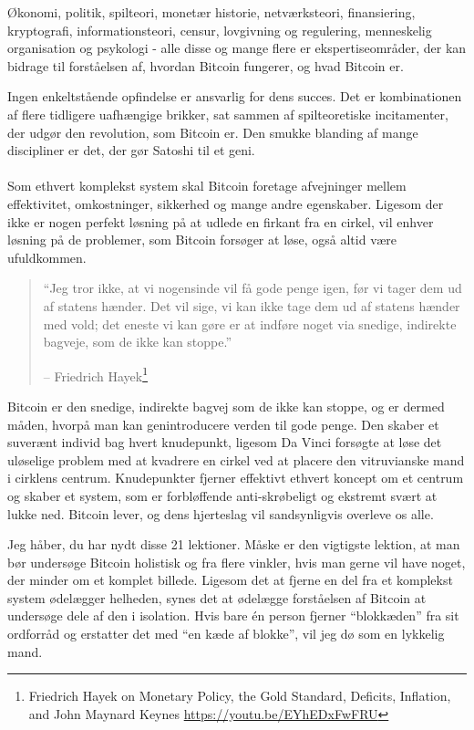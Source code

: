 \documentclass[paper=6in:9in,pagesize=pdftex,
               headinclude=on,footinclude=on,12pt]{scrbook}
\begin{document}
Økonomi, politik, spilteori, monetær historie, netværksteori, finansiering, kryptografi, informationsteori, censur, lovgivning og regulering, menneskelig organisation og psykologi - alle disse og mange flere er ekspertiseområder, der kan bidrage til forståelsen af, hvordan Bitcoin fungerer, og hvad Bitcoin er.

Ingen enkeltstående opfindelse er ansvarlig for dens succes. Det er kombinationen af flere tidligere uafhængige brikker, sat sammen af spilteoretiske incitamenter, der udgør den revolution, som Bitcoin er. Den smukke blanding af mange discipliner er det, der gør Satoshi til et geni.\paragraph{} Som ethvert komplekst system skal Bitcoin foretage afvejninger mellem effektivitet, omkostninger, sikkerhed og mange andre egenskaber. Ligesom der ikke er nogen perfekt løsning på at udlede en firkant fra en cirkel, vil enhver løsning på de problemer, som Bitcoin forsøger at løse, også altid være ufuldkommen.\begin{quotation}\begin{samepage} \enquote{Jeg tror ikke, at vi nogensinde vil få gode penge igen, før vi tager dem ud af statens hænder. Det vil sige, vi kan ikke tage dem ud af statens hænder med vold; det eneste vi kan gøre er at indføre noget via snedige, indirekte bagveje, som de ikke kan stoppe.} \begin{flushright} -- Friedrich Hayek\footnote{Friedrich Hayek on Monetary Policy, the Gold Standard, Deficits, Inflation, and John Maynard Keynes \url{https://youtu.be/EYhEDxFwFRU}}
\end{flushright}\end{samepage}\end{quotation}

Bitcoin er den snedige, indirekte bagvej som de ikke kan stoppe, og er dermed måden, hvorpå man kan genintroducere verden til gode penge. Den skaber et suverænt individ bag hvert knudepunkt, ligesom Da Vinci forsøgte at løse det uløselige problem med at kvadrere en cirkel ved at placere den vitruvianske mand i cirklens centrum. Knudepunkter fjerner effektivt ethvert koncept om et centrum og skaber et system, som er forbløffende anti-skrøbeligt og ekstremt svært at lukke ned. Bitcoin lever, og dens hjerteslag vil sandsynligvis overleve os alle.

Jeg håber, du har nydt disse 21 lektioner. Måske er den vigtigste lektion, at man bør undersøge Bitcoin holistisk og fra flere vinkler, hvis man gerne vil have noget, der minder om et komplet billede. Ligesom det at fjerne en del fra et komplekst system ødelægger helheden, synes det at ødelægge forståelsen af Bitcoin at undersøge dele af den i isolation. Hvis bare \'en person fjerner \enquote{blokkæden} fra sit ordforråd og erstatter det med \enquote{en kæde af blokke}, vil jeg dø som en lykkelig mand.
\end{document}
